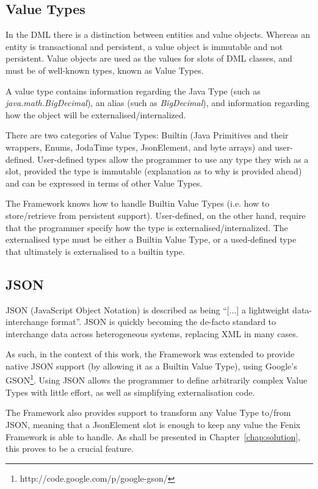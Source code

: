 \subsection{Value Types}

In the DML there is a distinction between entities and value
objects. Whereas an entity is transactional and persistent, a value
object is immutable and not persistent. Value objects are used as the
values for slots of DML classes, and must be of well-known types,
known as Value Types.

A value type contains information regarding the Java Type (such as
{\it java.math.BigDecimal}), an alias (such as {\it BigDecimal}), and information
regarding how the object will be externalised/internalized. 

There are two categories of Value Types: Builtin (Java Primitives and
their wrappers, Enums, JodaTime types, JsonElement, and byte arrays)
and user-defined. User-defined types allow the programmer to use any
type they wish as a slot, provided the type is immutable (explanation
as to why is provided ahead) and can be expressed in terms of other
Value Types.

The Framework knows how to handle Builtin Value Types (i.e. how to
store/retrieve from persistent support). User-defined, on the other
hand, require that the programmer specify how the type is
externalised/internalized. The externalised type must be either a
Builtin Value Type, or a used-defined type that ultimately is
externalised to a builtin type.

\subsection{JSON}
\label{sec:json}

JSON (JavaScript Object Notation) is described as being ``[...] a
lightweight data-interchange format''. JSON is quickly becoming the
de-facto standard to interchange data across heterogeneous systems,
replacing XML in many cases.

As such, in the context of this work, the Framework was extended to
provide native JSON support (by allowing it as a Builtin Value Type),
using Google's GSON\footnote{http://code.google.com/p/google-gson/}.
Using JSON allows the programmer to define arbitrarily complex Value
Types with little effort, as well as simplifying externalisation code.

The Framework also provides support to transform any Value Type
to/from JSON, meaning that a JsonElement slot is enough to keep any
value the Fenix Framework is able to handle. As shall be presented in
Chapter~\ref{chap:solution}, this proves to be a crucial feature.

